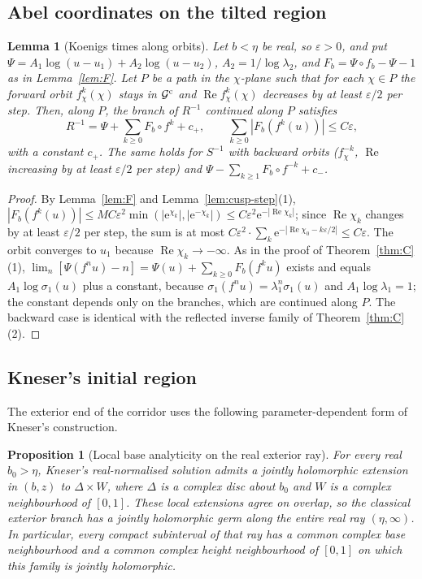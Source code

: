 \documentclass[11pt]{amsart}
\newtheorem{proposition}[theorem]{Proposition}
\newtheorem{lemma}[theorem]{Lemma}
\theoremstyle{definition}
\newcommand{\Rr}{R}
\newcommand{\eee}{\mathrm{e}}
\begin{document}
\subsection{Abel coordinates on the tilted region}

\begin{lemma}[Koenigs times along orbits]\label{lem:cusp-abel}
Let $b<\eta$ be real, so $\varepsilon>0$, and put
$\Psi=A_1\log(u-u_1)+A_2\log(u-u_2)$, $A_2=1/\log\lambda_2$, and
$F_b=\Psi\circ f_b-\Psi-1$ as in Lemma~\ref{lem:F}.  Let $P$ be a path in the
$\chi$-plane such that for each $\chi\in P$ the forward orbit $f_\chi^k(\chi)$ stays in
$\mathcal G^{\rm c}$ and $\operatorname{Re}f_\chi^k(\chi)$ decreases by at least $\varepsilon/2$ per step.  Then, along
$P$, the branch of $\Rr^{-1}$ continued along $P$ satisfies
\[
 \Rr^{-1}=\Psi+\sum_{k\ge0}F_b\circ f^k+c_+,\qquad
 \sum_{k\ge0}|F_b(f^k(u))|\le C\varepsilon,
\]
with a constant $c_+$.  The same holds for $S^{-1}$ with backward orbits
($f_\chi^{-k}$, $\operatorname{Re}$ increasing by at least $\varepsilon/2$ per step) and
$\Psi-\sum_{k\ge1}F_b\circ f^{-k}+c_-$.
\end{lemma}

\begin{proof}
By Lemma~\ref{lem:F} and Lemma~\ref{lem:cusp-step}(1),
$|F_b(f^k(u))|\le MC\varepsilon^2\min(|\eee^{\chi_k}|,|\eee^{-\chi_k}|)\le C\varepsilon^2\eee^{-|\operatorname{Re}\chi_k|}$;
since $\operatorname{Re}\chi_k$ changes by at least $\varepsilon/2$ per step, the sum is at most
$C\varepsilon^2\cdot\sum_k\eee^{-|\operatorname{Re}\chi_0-k\varepsilon/2|}\le C\varepsilon$.  The orbit converges to $u_1$
because $\operatorname{Re}\chi_k\to-\infty$.  As in the proof of Theorem~\ref{thm:C}(1),
$\lim_n[\Psi(f^nu)-n]=\Psi(u)+\sum_{k\ge0}F_b(f^ku)$ exists and equals
$A_1\log\sigma_1(u)$ plus a constant, because $\sigma_1(f^nu)=\lambda_1^n\sigma_1(u)$ and
$A_1\log\lambda_1=1$; the constant depends only on the branches, which are
continued along $P$.  The backward case is identical with the reflected
inverse family of Theorem~\ref{thm:C}(2).
\end{proof}

\subsection{Kneser's initial region}
The exterior end of the corridor uses the following parameter-dependent
form of Kneser's construction.
\begin{proposition}[Local base analyticity on the real exterior ray]
\label{prop:exterior-real-parameter}
For every real $b_0>\eta$, Kneser's real-normalised solution admits a
jointly holomorphic extension in $(b,z)$ to $\Delta\times W$, where
$\Delta$ is a complex disc about $b_0$ and $W$ is a complex
neighbourhood of $[0,1]$.  These local extensions agree on overlap,
so the classical exterior branch has a jointly holomorphic germ along
the entire real ray $(\eta,\infty)$.  In particular, every compact
subinterval of that ray has a common complex base neighbourhood and a
common complex height neighbourhood of $[0,1]$ on which this family is
jointly holomorphic.
\end{proposition}
\end{document}
